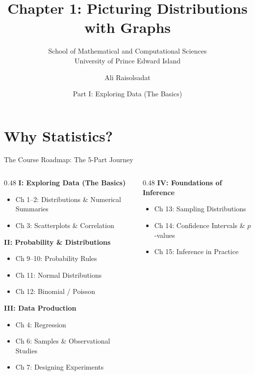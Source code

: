 \documentclass[aspectratio=169]{beamer}
\title[Chapter 1: Picturing Distributions]{\textbf{Chapter 1: Picturing Distributions with Graphs}}
\subtitle{School of Mathematical and Computational Sciences \\ University of Prince Edward Island}
\author{Ali Raisolsadat}
\date{Part I: Exploring Data (The Basics)}
\begin{document}
\section{Why Statistics?}

\begin{frame}
  \titlepage
\end{frame}

\begin{frame}{The Course Roadmap: The 5-Part Journey}
  \begin{columns}[T]
    \begin{column}{0.48\textwidth}
      \textbf{I: Exploring Data (The Basics)}
      \begin{itemize}
        \item Ch 1--2: Distributions \& Numerical Summaries
        \item Ch 3: Scatterplots \& Correlation
      \end{itemize}
      \vspace{0.1cm}
      \textbf{II: Probability \& Distributions}
      \begin{itemize}
        \item Ch 9--10: Probability Rules
        \item Ch 11: Normal Distributions
        \item Ch 12: Binomial / Poisson
      \end{itemize}
      \vspace{0.1cm}
      \textbf{III: Data Production}
      \begin{itemize}
        \item Ch 4: Regression
        \item Ch 6: Samples \& Observational Studies
        \item Ch 7: Designing Experiments
      \end{itemize}
    \end{column}
    \begin{column}{0.48\textwidth}
      \textbf{IV: Foundations of Inference}
      \begin{itemize}
        \item Ch 13: Sampling Distributions
        \item Ch 14: Confidence Intervals \& $p$-values
        \item Ch 15: Inference in Practice

\end{itemize}
\end{column}
\end{columns}
\end{frame}
\end{document}
